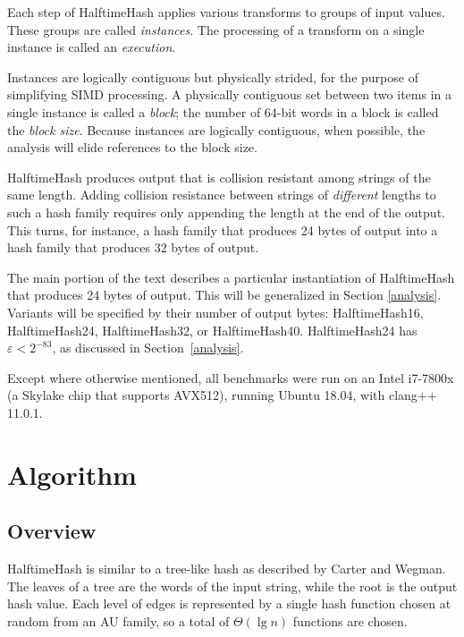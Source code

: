 \documentclass[runningheads]{llncs}
\begin{document}
Each step of HalftimeHash applies various transforms to groups of input values.
These groups are called {\em instances}.
The processing of a transform on a single instance is called an {\em execution}.

Instances are logically contiguous but physically strided, for the purpose of simplifying SIMD processing.
A physically contiguous set between two items in a single instance is called a {\em block}; the number of 64-bit words in a block is called the {\em block size}.
Because instances are logically contiguous, when possible, the analysis will elide references to the block size.

HalftimeHash produces output that is collision resistant among strings of the same length.
Adding collision resistance between strings of {\em different} lengths to such a hash family requires only appending the length at the end of the output.
This turns, for instance, a hash family that produces 24 bytes of output into a hash family that produces 32 bytes of output.

The main portion of the text describes a particular instantiation of HalftimeHash that produces 24 bytes of output.
This will be generalized in Section \ref{analysis}.
Variants will be specified by their number of output bytes: HalftimeHash16, HalftimeHash24, HalftimeHash32, or HalftimeHash40.
HalftimeHash24 has $\varepsilon < 2^{-83}$, as discussed in Section~\ref{analysis}.

Except where otherwise mentioned, all benchmarks were run on an Intel i7-7800x (a Skylake chip that supports AVX512), running Ubuntu 18.04, with clang++ 11.0.1.



\section{Algorithm}
\label{algo}

\subsection{Overview}

HalftimeHash is similar to a tree-like hash as described by Carter and Wegman. \cite[Section 3]{carter-wegman-79}
The leaves of a tree are the words of the input string, while the root is the output hash value.
Each level of edges is represented by a single hash function chosen at random from an AU family, so a total of $\Theta(\lg n)$ functions are chosen.
\end{document}
